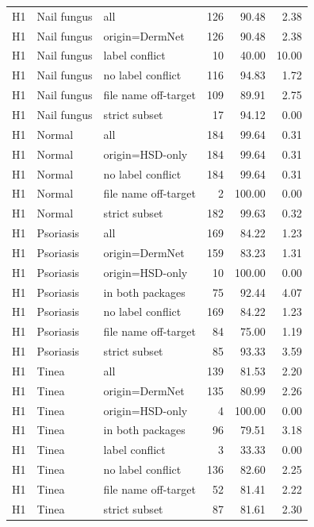 \begin{tabular}{lllrrr}
H1 & Nail fungus & all & 126 & 90.48 & 2.38 \\
H1 & Nail fungus & origin=DermNet & 126 & 90.48 & 2.38 \\
H1 & Nail fungus & label conflict & 10 & 40.00 & 10.00 \\
H1 & Nail fungus & no label conflict & 116 & 94.83 & 1.72 \\
H1 & Nail fungus & file name off-target & 109 & 89.91 & 2.75 \\
H1 & Nail fungus & strict subset & 17 & 94.12 & 0.00 \\
H1 & Normal & all & 184 & 99.64 & 0.31 \\
H1 & Normal & origin=HSD-only & 184 & 99.64 & 0.31 \\
H1 & Normal & no label conflict & 184 & 99.64 & 0.31 \\
H1 & Normal & file name off-target & 2 & 100.00 & 0.00 \\
H1 & Normal & strict subset & 182 & 99.63 & 0.32 \\
H1 & Psoriasis & all & 169 & 84.22 & 1.23 \\
H1 & Psoriasis & origin=DermNet & 159 & 83.23 & 1.31 \\
H1 & Psoriasis & origin=HSD-only & 10 & 100.00 & 0.00 \\
H1 & Psoriasis & in both packages & 75 & 92.44 & 4.07 \\
H1 & Psoriasis & no label conflict & 169 & 84.22 & 1.23 \\
H1 & Psoriasis & file name off-target & 84 & 75.00 & 1.19 \\
H1 & Psoriasis & strict subset & 85 & 93.33 & 3.59 \\
H1 & Tinea & all & 139 & 81.53 & 2.20 \\
H1 & Tinea & origin=DermNet & 135 & 80.99 & 2.26 \\
H1 & Tinea & origin=HSD-only & 4 & 100.00 & 0.00 \\
H1 & Tinea & in both packages & 96 & 79.51 & 3.18 \\
H1 & Tinea & label conflict & 3 & 33.33 & 0.00 \\
H1 & Tinea & no label conflict & 136 & 82.60 & 2.25 \\
H1 & Tinea & file name off-target & 52 & 81.41 & 2.22 \\
H1 & Tinea & strict subset & 87 & 81.61 & 2.30 \\
\bottomrule
\end{tabular}
